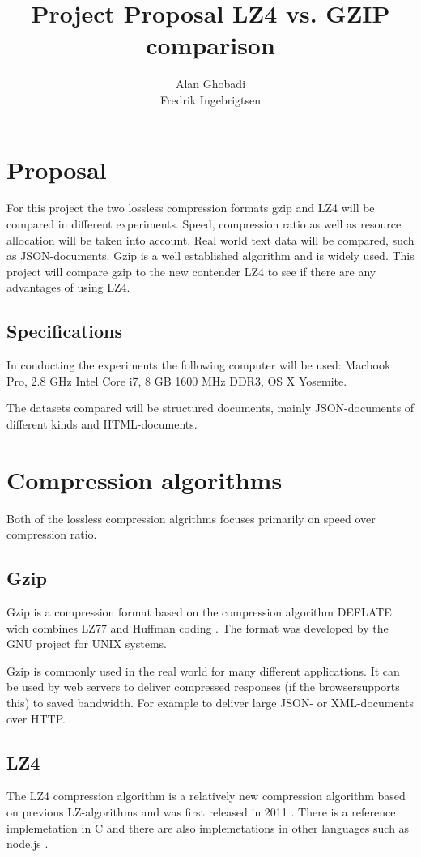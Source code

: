\documentclass[11pt]{article}
\title{\textbf{Project Proposal LZ4 vs. GZIP comparison}}
\author{Alan Ghobadi \\ Fredrik Ingebrigtsen}
\date{}
\begin{document}
\maketitle

\section{Proposal}

For this project the two lossless compression formats gzip \cite{gzipw} and LZ4 \cite{LZ4} will be compared in different experiments. Speed, compression ratio as well as resource allocation will be taken into account. Real world text data will be compared, such as JSON-documents. Gzip is a well established algorithm and is widely used. This project will compare gzip to the new contender LZ4 to see if there are any  advantages of using LZ4.

\subsection{Specifications}
In conducting the experiments the following computer will be used: Macbook Pro, 2.8 GHz Intel Core i7, 8 GB 1600 MHz DDR3, OS X Yosemite.

The datasets compared will be structured documents, mainly JSON-documents of different kinds and HTML-documents.
\section{Compression algorithms}
Both of the lossless compression algrithms focuses primarily on speed over compression ratio.
\subsection{Gzip}
Gzip is a compression format based on the compression algorithm DEFLATE \cite{def} wich combines LZ77 \cite{lz} and Huffman coding \cite{huff}. The format was developed by the GNU project for UNIX systems.

Gzip is commonly used in the real world for many different applications. It can be used by web servers to deliver compressed responses (if the browsersupports this) to saved bandwidth. For example to deliver large JSON- or XML-documents over HTTP.

\subsection{LZ4} 
The LZ4 compression algorithm is a relatively new compression algorithm based on previous LZ-algorithms and was first released in 2011 \cite{LZ4}. There is a reference implemetation in C \cite{cimp} and there are also implemetations in other languages such as node.js \cite{njs}.
\end{document}
